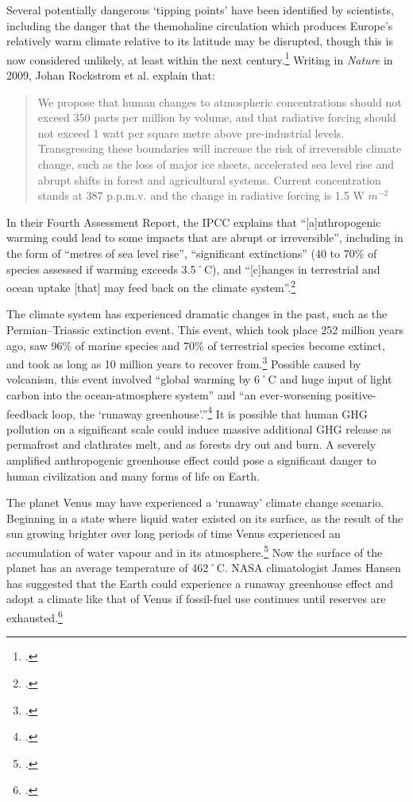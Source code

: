 Several potentially dangerous `tipping points' have been identified by scientists, including the danger that the themohaline circulation which produces Europe's relatively warm climate relative to its latitude may be disrupted, though this is now considered unlikely, at least within the next century.\footcite[][]{IPCCThermohaline}
Writing in \emph{Nature} in 2009, Johan Rockstrom et al. explain that:
\begin{quote}
We propose that human changes to atmospheric  concentrations should not exceed 350 parts per million by volume, and that radiative forcing should not exceed 1 watt per square metre above pre-industrial levels. Transgressing these boundaries will increase the risk of irreversible climate change, such as the loss of major ice sheets, accelerated sea level rise and abrupt shifts in forest and agricultural systems. Current  concentration stands at 387 p.p.m.v. and the change in radiative forcing is 1.5 W $m^{−2}$ 
\end{quote}
In their Fourth Assessment Report, the IPCC explains that ``[a]nthropogenic warming could lead to some impacts that are abrupt or irreversible'', including in the form of ``metres of sea level rise'', ``significant extinctions'' (40 to 70\% of species assessed if warming exceeds 3.5˚C), and ``[c]hanges in terrestrial and ocean  uptake [that] may feed back on the climate system''.\footcite[][p. 53]{IPCCar4_syr}




The climate system has experienced dramatic changes in the past, such as the Permian–Triassic extinction event.
This event, which took place 252 million years ago, saw 96\% of marine species and 70\% of terrestrial species become extinct, and took as long as 10 million years to recover from.\footcite[][p. 759--765]{PTRecovery}
Possible caused by volcanism, this event involved ``global warming by 6˚C and huge input of light carbon into the ocean-atmosphere system'' and ``an ever-worsening positive-feedback loop, the `runaway greenhouse'.''\footcite[][p. 358]{EndPermian}
It is possible that human GHG pollution on a significant scale could induce massive additional GHG release as permafrost and clathrates melt, and as forests dry out and burn.
A severely amplified anthropogenic greenhouse effect could pose a significant danger to human civilization and many forms of life on Earth.



The planet Venus may have experienced a `runaway' climate change scenario.
Beginning in a state where liquid water existed on its surface, as the result of the sun growing brighter over long periods of time Venus experienced an accumulation of water vapour and  in its atmosphere.\footcite[][]{VenusRunaway}
Now the surface of the planet has an average temperature of 462˚C.
NASA climatologist James Hansen has suggested that the Earth could experience a runaway greenhouse effect and adopt a climate like that of Venus if fossil-fuel use continues until reserves are exhausted.\footcite[][p. 22-23]{HansenVenusThreat}



